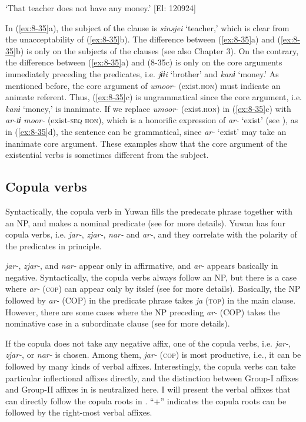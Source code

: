 \glt ‘That teacher does not have any money.’ [El: 120924]

In (\ref{ex:8-35}a), the subject of the clause is \textit{sinsjei} ‘teacher,’ which is clear from the unacceptability of (\ref{ex:8-35}b). The difference between (\ref{ex:8-35}a) and (\ref{ex:8-35}b) is only on the subjects of the clauses (see also Chapter 3). On the contrary, the difference between (\ref{ex:8-35}a) and (8-35c) is only on the core arguments immediately preceding the predicates, i.e. \textit{jɨɨi} ‘brother’ and \textit{kanɨ} ‘money.’ As mentioned before, the core argument of \textit{umoor-} (exist.\textsc{hon}) must indicate an animate referent. Thus, (\ref{ex:8-35}c) is ungrammatical since the core argument, i.e. \textit{kanɨ} ‘money,’ is inanimate. If we replace \textit{umoor-} (exist.\textsc{hon}) in (\ref{ex:8-35}c) with \textit{ar-tɨ} \textit{moor-} (exist-\textsc{seq} \textsc{hon}), which is a honorific expression of \textit{ar-} ‘exist’ (see ), as in (\ref{ex:8-35}d), the sentence can be grammatical, since \textit{ar-} ‘exist’ may take an inanimate core argument. These examples show that the core argument of the existential verbs is sometimes different from the subject.

\subsection{Copula verbs}

Syntactically, the copula verb in Yuwan fills the predecate phrase together with an NP, and makes a nominal predicate (see  for more details). Yuwan has four copula verbs, i.e. \textit{jar-}, \textit{zjar-}, \textit{nar-} and \textit{ar-}, and they correlate with the polarity of the predicates in principle.

  \textit{jar-}, \textit{zjar-}, and \textit{nar-} appear only in affirmative, and \textit{ar-} appears basically in negative. Syntactically, the copula verbs always follow an NP, but there is a case where \textit{ar-} (\textsc{cop}) can appear only by itslef (see  for more details). Basically, the NP followed by \textit{ar-} (COP) in the predicate phrase takes \textit{ja} (\textsc{top}) in the main clause. However, there are some cases where the NP preceding \textit{ar-} (COP) takes the nominative case in a subordinate clause (see  for more details).

  If the copula does not take any negative affix, one of the copula verbs, i.e. \textit{jar-}, \textit{zjar-}, or \textit{nar-} is chosen. Among them, \textit{jar-} (\textsc{cop}) is most productive, i.e., it can be followed by many kinds of verbal affixes. Interestingly, the copula verbs can take particular inflectional affixes directly, and the distinction between Group-I affixes and Group-II affixes in  is neutralized here. I will present the verbal affixes that can directly follow the copula roots in . “+” indicates the copula roots can be followed by the right-most verbal affixes.

